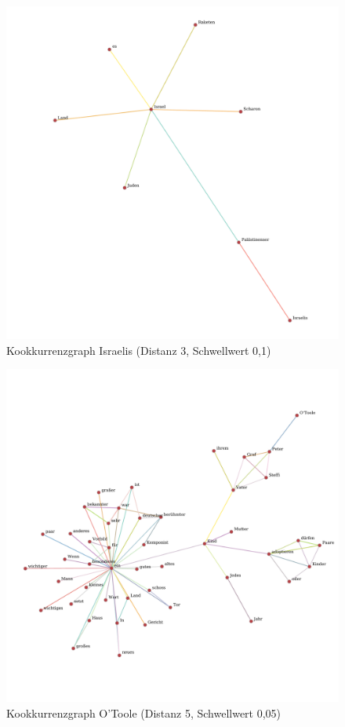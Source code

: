 \documentclass[11pt, a4paper]{article}
\begin{document}
\begin{figure}[hp!]
    \centering
        \includegraphics[scale=.4]{../../data/results/longpath_wordgraphs/nl/graph_Israelis.pdf}
    \caption{Kookkurrenzgraph Israelis (Distanz 3, Schwellwert 0,1)}
    \label{fig:lp-israelis}
\end{figure}

\begin{figure}[hp!]
    \centering
        \includegraphics[scale=.4]{../../data/results/longpath_wordgraphs/nl/graph_OToole.pdf}
    \caption{Kookkurrenzgraph O’Toole (Distanz 5, Schwellwert 0,05)}
    \label{fig:lp-otoole}
\end{figure}
\end{document}
